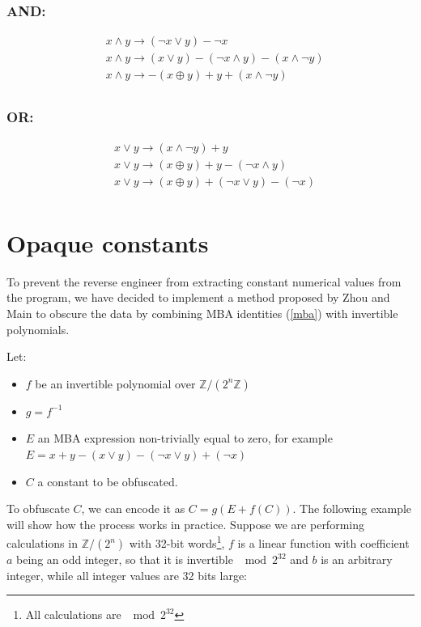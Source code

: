 \documentclass[
  digital, %
  table,   %
  twoside, %
  nolof,     %
  nolot,     %
]{fithesis3}
\theoremstyle{definition}
\begin{document}
\subsubsection{AND:}
$$
\begin{aligned}
&x \wedge y \rightarrow (\neg x \vee y) - \neg x  \\
&x \wedge y \rightarrow(x \vee y)-(\neg x \wedge y)-(x \wedge \neg y) \\
&x \wedge y \rightarrow-(x \oplus y)+y+(x \wedge \neg y) \\
\end{aligned}
$$

\subsubsection{OR:}
$$
\begin{aligned}
&x \vee y \rightarrow(x \wedge \neg y) + y\\
&x \vee y \rightarrow(x \oplus y)+y-(\neg x \wedge y) \\
&x \vee y \rightarrow(x \oplus y)+(\neg x \vee y)-(\neg x) \\
\end{aligned}
$$

\section{Opaque constants} \label{obf_const}

To prevent the reverse engineer from extracting constant numerical values from the program, we have decided to implement a method proposed by Zhou and Main \cite{mba_zhou} to obscure the data by combining MBA identities (\ref{mba}) with invertible polynomials. 

Let:

\begin{itemize}
    \item $f$ be an invertible polynomial over $\mathbb{Z}/(2^n\mathbb{Z})$
    \item $g = f^{-1}$
    \item $E$ an MBA expression non-trivially equal to zero, for example $E = x + y - (x \vee y)-(\neg x \vee y)+(\neg x)$
    \item $C$ a constant to be obfuscated.
\end{itemize}

To obfuscate $C$, we can encode it as $C = g(E + f(C))$. The following example will show how the process works in practice. Suppose we are performing calculations in $\mathbb{Z}/(2^n)$ with 32-bit words\footnote{All calculations are $\mod 2^{32}$}, $f$ is a linear function with coefficient $a$ being an odd integer, so that it is invertible $\mod 2^{32}$ and $b$ is an arbitrary integer, while all integer values are 32 bits large:
\end{document}

